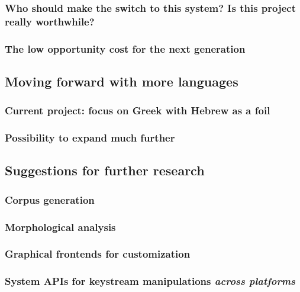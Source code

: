 \documentclass[11pt]{article}
\begin{document}
\subsubsection{Who should make the switch to this system? Is this project really worthwhile?}
\label{sec:org14acca5}

\subsubsection{The low opportunity cost for the next generation}
\label{sec:org423861e}

\subsection{Moving forward with more languages}
\label{sec:orge6326bb}

\subsubsection{Current project: focus on Greek with Hebrew as a foil}
\label{sec:org5b3e81c}

\subsubsection{Possibility to expand much further}
\label{sec:orgc57a05b}

\subsection{Suggestions for further research}
\label{sec:orgc68ca17}

\subsubsection{Corpus generation}
\label{sec:orgf8f9285}

\subsubsection{Morphological analysis}
\label{sec:org6d329e4}

\subsubsection{Graphical frontends for customization}
\label{sec:org97d708c}

\subsubsection{System APIs for keystream manipulations \emph{across platforms}}
\label{sec:org74399c9}
\end{document}
